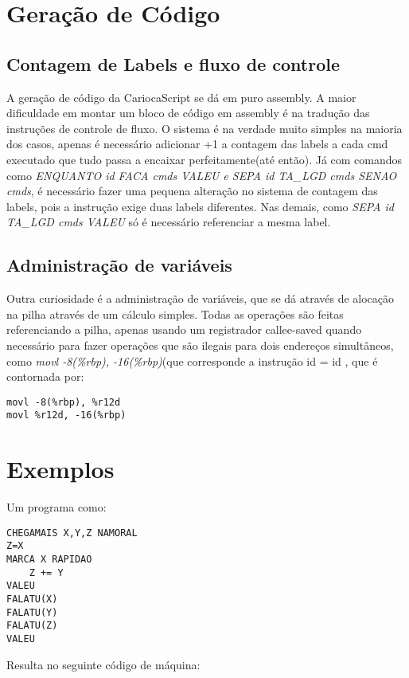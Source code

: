 \documentclass{article}
\begin{document}
\section{Geração de Código}

\subsection{Contagem de Labels e fluxo de controle}
A geração de código da CariocaScript se dá em puro assembly. A maior
dificuldade em montar um bloco de código em assembly é na tradução das
instruções de controle de fluxo. O sistema é na verdade muito simples na
maioria dos casos, apenas é necessário adicionar +1 a contagem das labels a
cada cmd executado que tudo passa a encaixar perfeitamente(até então). Já com
comandos como \textit{ENQUANTO id FACA cmds VALEU e SEPA id TA\_LGD cmds SENAO cmds},
 é necessário fazer uma pequena alteração no sistema de contagem
das labels, pois a instrução exige duas labels diferentes. Nas demais, como
\textit{SEPA id TA\_LGD cmds VALEU} só é necessário referenciar a mesma label.

\subsection{Administração de variáveis}
Outra curiosidade é a administração de variáveis, que se dá através de alocação
na pilha através de um cálculo simples. Todas as operações são feitas
referenciando a pilha, apenas usando um registrador callee-saved quando
necessário para fazer operações que são ilegais para dois endereços
simultâneos, como \textit{movl -8(\%rbp), -16(\%rbp)}(que corresponde a instrução id = id
, que é contornada por:
\begin{lstlisting}
movl -8(%rbp), %r12d
movl %r12d, -16(%rbp)
\end{lstlisting}

\section{Exemplos}

Um programa como:

\begin{lstlisting}
CHEGAMAIS X,Y,Z NAMORAL
Z=X
MARCA X RAPIDAO
	Z += Y
VALEU
FALATU(X)
FALATU(Y)
FALATU(Z)
VALEU
\end{lstlisting}

\noindent
Resulta no seguinte código de máquina:
\end{document}
